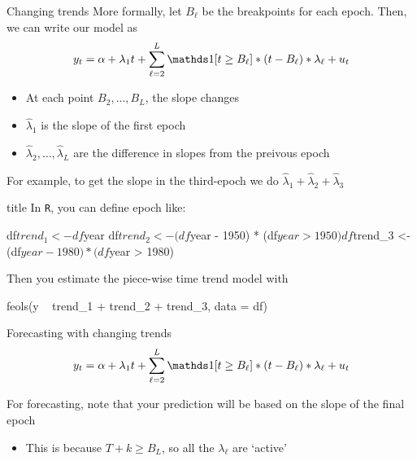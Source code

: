 \documentclass[aspectratio=169,t,11pt,table]{beamer}
\begin{document}
\begin{frame}{Changing trends}
  More formally, let $B_\ell$ be the breakpoints for each epoch. Then, we can write our model as 
  $$
    y_t = \alpha + \lambda_1 t + \sum_{\ell = 2}^L \one{t \geq B_\ell} * (t - B_\ell) * \lambda_\ell + u_t
  $$
  \begin{itemize}
    \item At each point $B_2, \dots, B_L$, the slope changes
    \item $\hat{\lambda}_1$ is the slope of the first epoch
    \item $\hat{\lambda}_2, \dots, \hat{\lambda}_L$ are the difference in slopes from the preivous epoch
  \end{itemize}

  \bigskip
  For example, to get the slope in the third-epoch we do $\hat{\lambda}_1 + \hat{\lambda}_2 + \hat{\lambda}_3$
\end{frame}

\begin{frame}[fragile]{title}
  In \texttt{R}, you can define epoch like:
  \begin{codeblock}
df$trend_1 <- df$year
df$trend_2 <- (df$year - 1950) * (df$year > 1950)
df$trend_3 <- (df$year - 1980) * (df$year > 1980)
  \end{codeblock}

  Then you estimate the piece-wise time trend model with
  \begin{codeblock}
feols(y ~ trend_1 + trend_2 + trend_3, data = df)
  \end{codeblock}
\end{frame}


\begin{frame}{Forecasting with changing trends}
  \vspace*{-\bigskipamount}
  $$
    y_t = \alpha + \lambda_1 t + \sum_{\ell = 2}^L \one{t \geq B_\ell} * (t - B_\ell) * \lambda_\ell + u_t
  $$
  
  \bigskip
  For forecasting, note that your prediction will be based on the slope of the final epoch
  \begin{itemize}
    \item This is because $T + k \geq B_L$, so all the $\lambda_\ell$ are `active'
  \end{itemize}
\end{frame}
\end{document}
